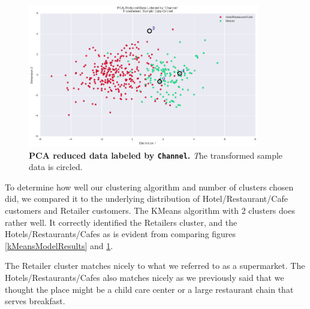 \documentclass[twoside,openright,titlepage,numbers=noenddot,headinclude,%
               footinclude=true,cleardoublepage=empty,abstractoff,BCOR=5mm,%
               paper=a4,fontsize=11pt,ngerman,american]{scrreprt}
\numberwithin{theorem}{chapter}
\numberwithin{definition}{chapter}
\numberwithin{algorithm}{chapter}
\numberwithin{figure}{chapter}
\numberwithin{table}{chapter}
\numberwithin{equation}{chapter}
\begin{document}
\begin{figure}[!hbtp]
\centering
    
    \includegraphics[width=0.9\textwidth]{figures/regions}
    
    \caption{\textbf{PCA reduced data labeled by \texttt{Channel}.} \textit The transformed sample data is circled. }\label{regions}
\end{figure}


To determine how well our clustering algorithm and number of clusters chosen did, we compared it to the underlying distribution of Hotel/Restaurant/Cafe customers and Retailer customers. The KMeans algorithm with 2 clusters does rather well. It correctly identified the Retailers cluster, and the Hotels/Restaurants/Cafes as is evident from comparing figures \ref{kMeansModelResults} and \ref{regions}.

The Retailer cluster matches nicely to what we referred to as a supermarket. The Hotels/Restaurants/Cafes also matches nicely as we previously said that we thought the place might be a child care center or a large restaurant chain that serves breakfast.
\end{document}
